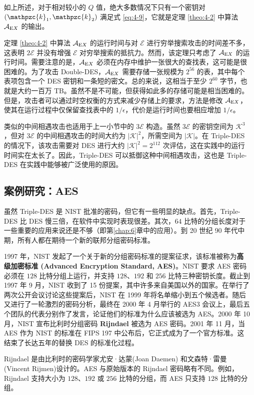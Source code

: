 如上所述，对于相对较小的 $Q$ 值，绝大多数情况下只有一个密钥对 $(\mathpzc{k}_1,\mathpzc{k}_2)$ 满足式 \ref{eq:4-9}，它就是定理 \ref{theo:4-2} 中算法 $\mathcal{A}_{{\rm E}X}$ 的输出。

定理 \ref{theo:4-2} 中算法 $\mathcal{A}_{{\rm E}X}$ 的运行时间与对 $\mathcal{E}$ 进行穷举搜索攻击的时间差不多，这表明 $2\mathcal{E}$ 并没有增强 $\mathcal{E}$ 对穷举搜索的抵抗力。然而，该定理只考虑了 $\mathcal{A}_{{\rm E}X}$ 的运行时间。需要注意的是，$\mathcal{A}_{{\rm E}X}$ 必须在内存中维护一张很大的查找表，这可能是很困难的。为了攻击 Double-DES，$\mathcal{A}_{{\rm E}X}$ 需要存储一张规模为 $2^{56}$ 的表，其中每个表项包含一个 DES 密钥和一条短的密文。总的来说，这相当于至少 $2^{60}$ 字节，也就是大约一百万 TB。虽然不是不可能，但获得如此多的存储可能是相当困难的。但是，攻击者可以通过时空权衡的方式来减少存储上的要求，方法是修改 $\mathcal{A}_{{\rm E}X}$，使其在运行过程中仅保留查找表中的 ${1}/{\epsilon}$，代价是运行时间也要相应增加 ${1}/{\epsilon}$。


\begin{snote}
类似的中间相遇攻击也适用于上一小节中的 $3\mathcal{E}$ 构造。虽然 $3\mathcal{E}$ 的密钥空间为 $\mathcal{K}^3$，但对 $3\mathcal{E}$ 的中间相遇攻击的时间大约为 $|\mathcal{K}|^2$，所需空间为 $|\mathcal{K}|$。在 Triple-DES 的情况下，该攻击需要对 DES 进行大约 $|\mathcal{K}|^2=2^{112}$ 次评估，这在实践中的运行时间实在太长了。因此，Triple-DES 可以抵御这种中间相遇攻击，这也是 Triple-DES 在实践中能够被广泛使用的原因。
\end{snote}

\subsection{案例研究：AES}

虽然 Triple-DES 是 NIST 批准的密码，但它有一些明显的缺点。首先，Triple-DES 比 DES 慢三倍，在软件中实现时表现很差。其次，$64$ 比特的分组长度对于一些重要的应用来说还是不够（即第\ref{chap:6}章中的应用）。到 20 世纪 90 年代中期，所有人都在期待一个新的联邦分组密码标准。

\begin{snote}[AES的历程。]
1997 年，NIST 发起了一个关于新的分组密码标准的提案征求，该标准被称为\textbf{高级加密标准 (Advanced Encryption Standard, AES)}。NIST 要求 AES 密码必须在 $128$ 比特分组上运行，并支持 $128$、$192$ 和 $256$ 比特三种密钥长度。截止到 1997 年 9 月，NIST 收到了 15 份提案，其中许多来自美国以外的国家。在举行了两次公开会议讨论这些提案后，NIST 在 1999 年将名单缩小到五个候选者。随后又进行了一轮激烈的密码分析，最终在 2000 年 4 月举行的 AES3 会议上，最后五个团队的代表分别作了发言，论证他们的标准为什么应该被选为 AES。2000 年 10 月，NIST 宣布比利时分组密码 \textbf{Rijndael} 被选为 AES 密码。2001 年 11 月，当 AES 作为 NIST 的标准在 FIPS 197 中公布后，它正式成为了一个官方标准。这结束了长达五年的替换 DES 的标准化过程。

Rijndael 是由比利时的密码学家尤安·达蒙(Joan Daemen) 和文森特·雷曼(Vincent Rijmen)设计的。AES 与原始版本的 Rijndael 密码略有不同。例如，Rijndael 支持大小为 $128$、$192$ 或 $256$ 比特的分组，而 AES 只支持 $128$ 比特的分组。
\end{snote}

